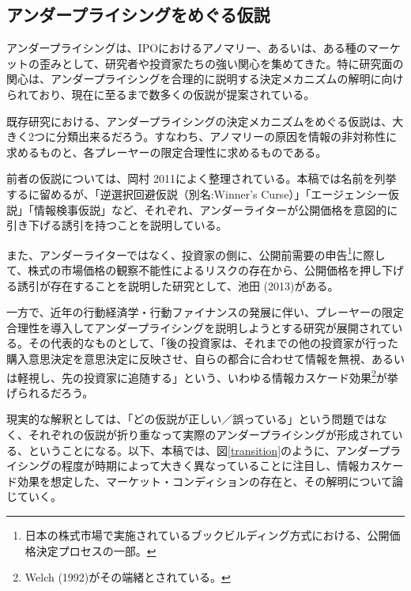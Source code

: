 \documentclass{jsarticle}
\begin{document}
\subsection{アンダープライシングをめぐる仮説}
アンダープライシングは、IPOにおけるアノマリー、あるいは、ある種のマーケットの歪みとして、研究者や投資家たちの強い関心を集めてきた。特に研究面の関心は、アンダープライシングを合理的に説明する決定メカニズムの解明に向けられており、現在に至るまで数多くの仮説が提案されている。\par
既存研究における、アンダープライシングの決定メカニズムをめぐる仮説は、大きく2つに分類出来るだろう。すなわち、アノマリーの原因を情報の非対称性に求めるものと、各プレーヤーの限定合理性に求めるものである。\par
前者の仮説については、岡村 2011\cite{okamura}によく整理されている。本稿では名前を列挙するに留めるが、「逆選択回避仮説（別名:Winner's Curse）」「エージェンシー仮説」「情報検事仮説」など、それぞれ、アンダーライターが公開価格を意図的に引き下げる誘引を持つことを説明している。\par

また、アンダーライターではなく、投資家の側に、公開前需要の申告\footnote[5]{日本の株式市場で実施されているブックビルディング方式における、公開価格決定プロセスの一部。}に際して、株式の市場価格の観察不能性によるリスクの存在から、公開価格を押し下げる誘引が存在することを説明した研究として、池田 (2013)\cite{ikeda}がある。\par

一方で、近年の行動経済学・行動ファイナンスの発展に伴い、プレーヤーの限定合理性を導入してアンダープライシングを説明しようとする研究が展開されている。その代表的なものとして、「後の投資家は、それまでの他の投資家が行った購入意思決定を意思決定に反映させ、自らの都合に合わせて情報を無視、あるいは軽視し、先の投資家に追随する」という、いわゆる情報カスケード効果\footnote[6]{Welch (1992)\cite{Welch}がその端緒とされている。}が挙げられるだろう。\par




現実的な解釈としては、「どの仮説が正しい／誤っている」という問題ではなく、それぞれの仮説が折り重なって実際のアンダープライシングが形成されている、ということになる。以下、本稿では、図\ref{transition}のように、アンダープライシングの程度が時期によって大きく異なっていることに注目し、情報カスケード効果を想定した、マーケット・コンディションの存在と、その解明について論じていく。
\end{document}
